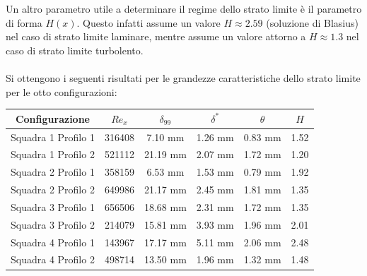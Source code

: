 Un altro parametro utile a determinare il regime dello strato limite è il parametro di forma $H(x)$. Questo infatti assume un valore $H\approx2.59$ (soluzione di Blasius) nel caso di strato limite laminare, mentre assume un valore attorno a $H\approx1.3$ nel caso di strato limite turbolento.\\\\
Si ottengono i seguenti risultati per le grandezze caratteristiche dello strato limite per le otto configurazioni: 
\begin{table}[H]
    \centering
    \begin{tabular}{|c|c|c|c|c|c|}
    \hline
    Configurazione             & $Re_x$ & $\delta_{99}$ & $\delta^*$ & $\theta$ & $H$  \\ \hline
    Squadra 1 Profilo 1 & 316408 & 7.10 mm     & 1.26 mm    & 0.83 mm  & 1.52 \\ \hline
    Squadra 1 Profilo 2 & 521112 & 21.19 mm    & 2.07 mm    & 1.72 mm  & 1.20 \\ \hline
    Squadra 2 Profilo 1 & 358159 & 6.53 mm     & 1.53 mm    & 0.79 mm  & 1.92 \\ \hline
    Squadra 2 Profilo 2 & 649986 & 21.17 mm    & 2.45 mm    & 1.81 mm  & 1.35 \\ \hline
    Squadra 3 Profilo 1 & 656506 & 18.68 mm    & 2.31 mm    & 1.72 mm  & 1.35 \\ \hline
    Squadra 3 Profilo 2 & 214079 & 15.81 mm    & 3.93 mm    & 1.96 mm  & 2.01 \\ \hline
    Squadra 4 Profilo 1 & 143967 & 17.17 mm    & 5.11 mm    & 2.06 mm  & 2.48 \\ \hline
    Squadra 4 Profilo 2 & 498714 & 13.50 mm    & 1.96 mm    & 1.32 mm  & 1.48 \\ \hline
    \end{tabular}
\end{table}

